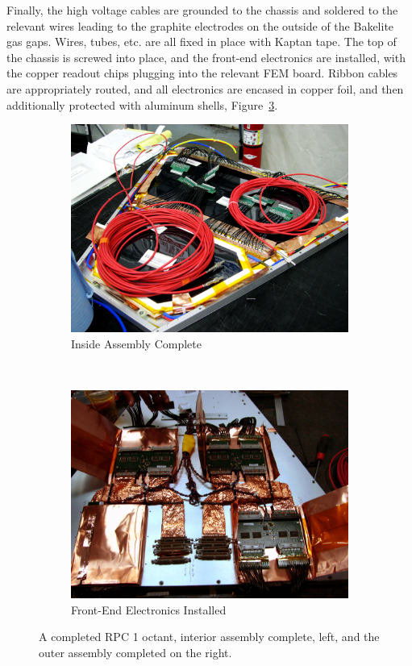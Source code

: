 Finally, the high voltage cables are grounded to the chassis and soldered to the
relevant wires leading to the graphite electrodes on the outside of the Bakelite
gas gaps. Wires, tubes, etc. are all fixed in place with Kaptan tape. The top of
the chassis is screwed into place, and the front-end electronics are installed,
with the copper readout chips plugging into the relevant FEM board. Ribbon
cables are appropriately routed, and all electronics are encased in copper foil,
and then additionally protected with aluminum shells,
Figure~\ref{fig:rpc1_final_assembly}.

\begin{figure}
  \centering
  \begin{subfigure}[b]{0.5\textwidth}
    \centering
    \includegraphics[width=\linewidth]{./figures/rpc1_construction_7}
    \caption{Inside Assembly Complete}
    \label{fig:rpc1_assembled}
  \end{subfigure}%
  ~
  \begin{subfigure}[b]{0.5\textwidth}
    \centering
    \includegraphics[width=\linewidth]{./figures/rpc1_construction_8}
    \caption{Front-End Electronics Installed}
    \label{fig:rpc1_fem_installed}
  \end{subfigure}
  \caption{
    A completed RPC 1 octant, interior assembly complete, left, and the outer
    assembly completed on the right.
  }
  \label{fig:rpc1_final_assembly}
\end{figure}

